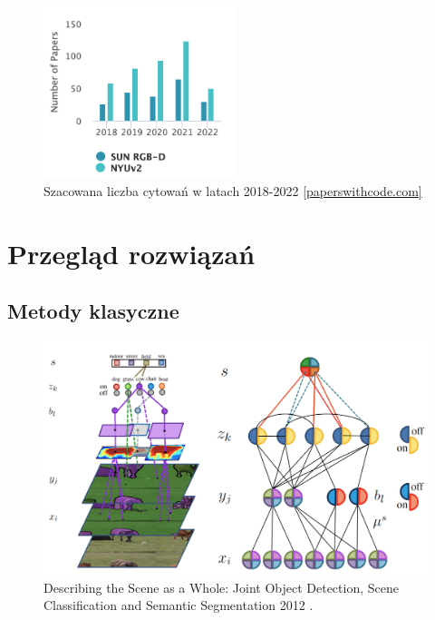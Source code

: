 \begin{figure}
    \centering
    \includegraphics[width=0.5\textwidth]{images/stats-dataset.png}
    \caption[]{Szacowana liczba cytowań w latach 2018-2022 \href{https://paperswithcode.com/dataset/sun-rgb-d}{[paperswithcode.com]}}
    \label{fig:sun-vs-nyu}
\end{figure}

\section{Przegląd rozwiązań}
\subsection{Metody klasyczne}
\begin{figure}
    \includegraphics[width=\textwidth]{images/joint-segmentation-and-classification.png}
    \caption{Describing the Scene as a Whole: Joint Object Detection, Scene Classification and Semantic Segmentation 2012 \cite{yao2012describing}.}
    \label{fig:old-school-arch}
\end{figure}